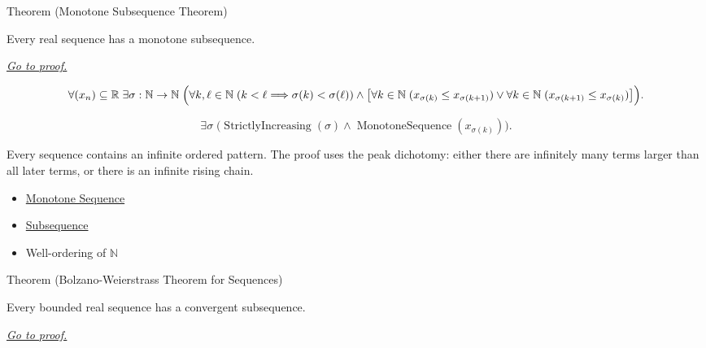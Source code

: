 \begin{theorembox}{Theorem (Monotone Subsequence Theorem)}
\begin{theorem}
\label{thm:monotone-subsequence-theorem}
Every real sequence has a monotone subsequence.

\smallskip
\noindent
\hyperref[prf:monotone-subsequence-theorem]{\textit{Go to proof.}}
\end{theorem}
\end{theorembox}

\begin{remark*}
\[
\forall (x_n)\subseteq\mathbb{R}\;\exists \sigma:\mathbb{N}\to\mathbb{N}\;
\Bigl(
  \forall k,\ell\in\mathbb{N}\;(k<\ell\Longrightarrow\sigma(k)<\sigma(\ell))
  \land
  \bigl[
    \forall k\in\mathbb{N}\;(x_{\sigma(k)}\le x_{\sigma(k+1)})
    \lor
    \forall k\in\mathbb{N}\;(x_{\sigma(k+1)}\le x_{\sigma(k)})
  \bigr]
\Bigr).
\]
\end{remark*}

\begin{remark*}
\[
\exists \sigma\;\bigl(
\operatorname{StrictlyIncreasing}(\sigma)
\land
\operatorname{MonotoneSequence}(x_{\sigma(k)})
\bigr).
\]
\end{remark*}

\begin{remark*}[Interpretation]
Every sequence contains an infinite ordered pattern. The proof uses the peak
dichotomy: either there are infinitely many terms larger than all later terms,
or there is an infinite rising chain.
\end{remark*}

\begin{dependencies}
\begin{itemize}
  \item \hyperref[def:monotone-sequence]{Monotone Sequence}
  \item \hyperref[def:subsequence]{Subsequence}
  \item Well-ordering of $\mathbb{N}$
\end{itemize}
\end{dependencies}


\begin{theorembox}{Theorem (Bolzano-Weierstrass Theorem for Sequences)}
\begin{theorem}
\label{thm:bolzano-weierstrass-sequences}
Every bounded real sequence has a convergent subsequence.

\smallskip
\noindent
\hyperref[prf:bolzano-weierstrass-sequences]{\textit{Go to proof.}}
\end{theorem}
\end{theorembox}

